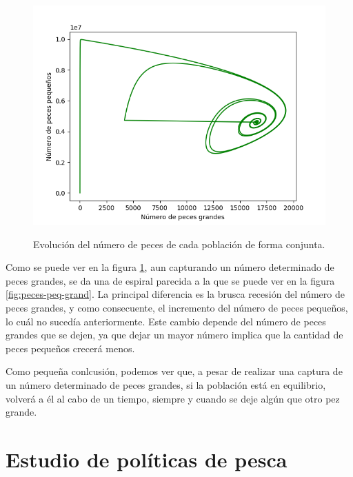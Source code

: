 \documentclass[11pt,a4paper]{report}
\begin{document}
\begin{figure}[H]
\begin{minipage}{.5\textwidth}
  \label{fig:peces-pg-tercio}
\end{minipage}
\begin{minipage}{0.5\textwidth}
  \centering
  \includegraphics[scale=0.4]{img/peces-pg-cuarto.png}
  \label{fig:peces-pg-cuarto}
\end{minipage}
\caption{Evolución del número de peces de cada población de forma conjunta.}
\label{fig:peces-pg-captura}
\end{figure}

Como se puede ver en la figura \ref{fig:peces-pg-captura}, aun capturando un número determinado de peces grandes,
se da una de espiral parecida a la que se puede ver en la figura \ref{fig:peces-peq-grand}. La principal diferencia es
la brusca recesión del número de peces grandes, y como consecuente, el incremento del número de peces pequeños, lo cuál
no sucedía anteriormente. Este cambio depende del número de peces grandes que se dejen, ya que dejar un mayor número implica
que la cantidad de peces pequeños crecerá menos.

Como pequeña conlcusión, podemos ver que, a pesar de realizar una captura de un número determinado de peces grandes, si la
población está en equilibrio, volverá a él al cabo de un tiempo, siempre y cuando se deje algún que otro pez grande.

\section{Estudio de políticas de pesca}
\end{document}
